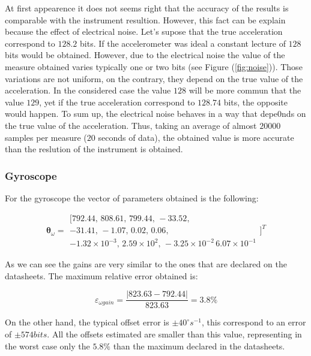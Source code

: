 \documentclass[conference]{IEEEtran}
\newcommand{\refp}[1]{(\ref{#1})}
\begin{document}
At first appearence it does not seems right that the accuracy of the results is comparable with the instrument resultion. However, this fact can be explain because the effect of electrical noise. Let's supose that the true acceleration correspond to $128.2$ bits. If the accelerometer was ideal a constant lecture of $128$ bits would be obtained. However, due to the electrical noise the value of the measure obtained varies typically one or two bits (see Figure \refp{fig:noise}). Those variations are not uniform, on the contrary, they depend on the true value of the acceleration. In the considered case the value $128$ will be more commun that the value $129$, yet if the true acceleration correspond to $128.74$ bits, the opposite would happen. To sum up, the electrical noise behaves in a way that depe0nds on the true value of the acceleration. Thus, taking an average of almost $20000$ samples per measure ($20$ seconds of data), the obtained value is more accurate than the reslution of the instrument is obtained. \\


\subsubsection{Gyroscope}
For the gyroscope the vector of parameters obtained is the following:

\begin{equation}
\boldsymbol{\theta}_\omega = \begin{array}{c}
[792.44,\, 808.61, \, 799.44, \, -33.52,  \\
-31.41, \, -1.07, \, 0.02, \, 0.06, \\
 -1.32 \times 10^{-3}, \,  2.59\times 10^{2}, \,  -3.25 \times 10^{-2} \, 6.07\times 10^{-1}
 \end{array}]^T
\end{equation}

As we can see the gains are very similar to the ones that are declared on the datasheets. The maximum relative error obtained is:

\begin{equation}
\varepsilon_{\omega gain} = \frac{|823.63 - 792.44|}{823.63} = 3.8 \%
\end{equation}

On the other hand, the typical offset error is $\pm 40 ^\circ s^{-1}$, this correspond to an error of $\pm 574 bits$. All the offsets estimated are smaller than this value, representing in the worst case only the $5.8 \%$ than the maximum declared in the datasheets. \\
\end{document}
